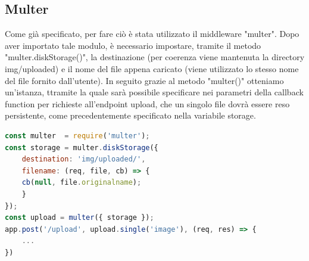 \subsection{Multer}
Come già specificato, per fare ciò è stata utilizzato il middleware "multer".
Dopo aver importato tale modulo, è necessario impostare, tramite il metodo "multer.diskStorage()", la destinazione (per coerenza viene mantenuta la directory img/uploaded) e il nome del file appena caricato (viene utilizzato lo stesso nome del file fornito dall'utente).
In seguito grazie al metodo "multer()" otteniamo un'istanza, ttramite la quale sarà possibile specificare nei parametri della callback function per richieste all'endpoint upload, che un singolo file dovrà essere reso persistente, come precedentemente specificato nella variabile storage. 
\newpage
\begin{lstlisting}[language=Javascript, caption={Configurazione upload immagine}, showstringspaces=false]
const multer  = require('multer');
const storage = multer.diskStorage({
    destination: 'img/uploaded/',
    filename: (req, file, cb) => {
    cb(null, file.originalname);
    }
});
const upload = multer({ storage });
app.post('/upload', upload.single('image'), (req, res) => {
    ...
})
\end{lstlisting}
